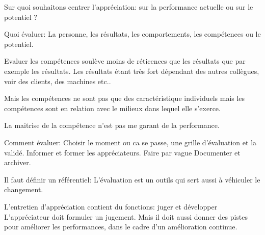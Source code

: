 Sur quoi souhaitons centrer l'appréciation: sur la performance actuelle ou sur le potentiel ? 

Quoi évaluer: La personne, les résultats, les comportements, les compétences ou le potentiel. 

Evaluer les compétences soulève moins de réticences que les résultats que par exemple les résultats. 
Les résultats étant très fort dépendant des autres collègues, voir des clients, des machines etc.. 

Mais les compétences ne sont pas que des caractéristique individuels mais les compétences sont en relation avec le milieux dans lequel elle s'exerce. 

La maitrise de la compétence n'est pas me garant de la performance. 

Comment évaluer: Choisir le moment ou ca se passe, une grille d'évaluation et la validé.
Informer et former les appréciateurs.
Faire par vague
Documenter et archiver.

Il faut définir un référentiel: L'évaluation est un outils qui sert aussi à véhiculer le changement. 

L'entretien d'appréciation contient du fonctions: juger et développer 
L'appréciateur doit formuler un jugement. 
Mais il doit aussi donner des pistes pour améliorer les performances, dans le cadre d'un amélioration continue.
